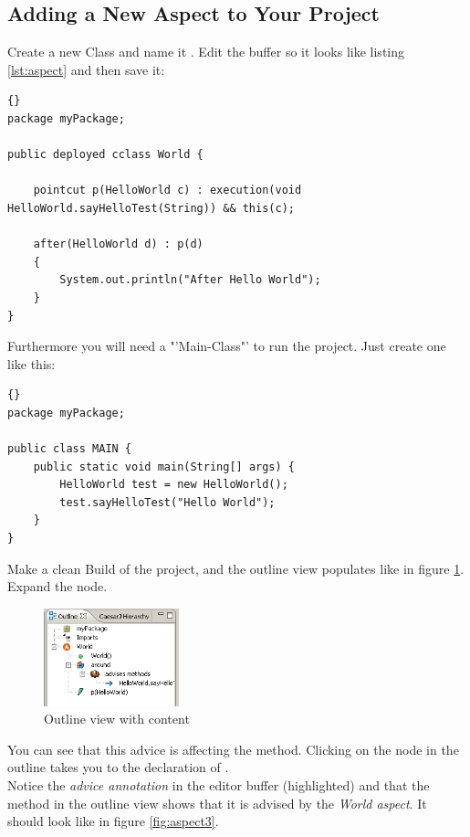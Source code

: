 \subsection{Adding a New Aspect to Your Project}
Create a new Class and name it . Edit the buffer so it looks like listing \ref{lst:aspect} and then save it:
\begin{lstlisting}[basicstyle=\small\it,caption=An \caesarj -cclass including an aspect,label=lst:aspect,name=listing:aspect,frame=none]{}
package myPackage;

public deployed cclass World {
	
	pointcut p(HelloWorld c) : execution(void HelloWorld.sayHelloTest(String)) && this(c);
   
	after(HelloWorld d) : p(d)
	{
		System.out.println("After Hello World");
	} 
} 
\end{lstlisting}

Furthermore you will need a "'Main-Class"' to run the project. Just create one like this:

\begin{lstlisting}[basicstyle=\small\it,caption=An \caesarj -java-class including an main method,label=lst:main,name=listing:main,frame=none]{}
package myPackage;

public class MAIN {
	public static void main(String[] args) {
		HelloWorld test = new HelloWorld();
		test.sayHelloTest("Hello World");
	}
}
\end{lstlisting}

Make a clean Build of the project, and the outline view populates like in figure \ref{fig:aspect2}. Expand the  node.

\begin{figure}[htbp]
	\centering
		\includegraphics[width=0.35\textwidth]{images/aspect2.png}
	\caption{Outline view with content}
	\label{fig:aspect2}
\end{figure}

You can see that this advice is affecting the  method. Clicking on the  node in the outline takes you to the declaration of .\\
Notice the \textit{advice annotation} in the editor buffer (highlighted) and that the  method in the outline view shows that it is advised by the \textit{World aspect}. It should look like in figure \ref{fig:aspect3}.

